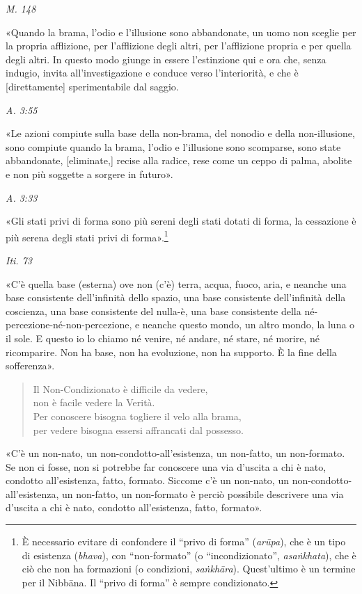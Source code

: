 \emph{M. 148}


«Quando la brama, l’odio e l’illusione sono abbandonate, un uomo non
sceglie per la propria afflizione, per l’afflizione degli altri, per
l’afflizione propria e per quella degli altri. In questo modo giunge in
essere l’estinzione qui e ora che, senza indugio, invita
all’investigazione e conduce verso l’interiorità, e che è [direttamente]
sperimentabile dal saggio.


\emph{A. 3:55}


«Le azioni compiute sulla base della non-brama, del nonodio e della
non-illusione, sono compiute quando la brama, l’odio e l’illusione sono
scomparse, sono state abbandonate, [eliminate,] recise alla radice, rese
come un ceppo di palma, abolite e non più soggette a sorgere in futuro».


\emph{A. 3:33}


«Gli stati privi di forma sono più sereni degli stati dotati di forma,
la cessazione è più serena degli stati privi di
forma».\footnote{È necessario evitare di confondere il “privo di forma” (\emph{arūpa}), che è un tipo di esistenza (\emph{bhava}), con “non-formato” (o “incondizionato”, \emph{asaṅkhata}), che è ciò che non ha formazioni (o condizioni, \emph{saṅkhāra}). Quest’ultimo è un termine per il Nibbāna. Il “privo di forma” è sempre condizionato.}


\emph{Iti. 73}


«C’è quella base (esterna) ove non (c’è) terra, acqua, fuoco, aria, e
neanche una base consistente dell’infinità dello spazio, una base
consistente dell’infinità della coscienza, una base consistente del
nulla-è, una base consistente della né-percezione-né-non-percezione, e
neanche questo mondo, un altro mondo, la luna o il sole. E questo io lo
chiamo né venire, né andare, né stare, né morire, né ricomparire. Non ha
base, non ha evoluzione, non ha supporto. È la fine della sofferenza».


\begin{quote}
Il Non-Condizionato è difficile da vedere, \\
non è facile vedere la Verità. \\
Per conoscere bisogna togliere il velo alla brama, \\
per vedere bisogna essersi affrancati dal possesso.
\end{quote}

«C’è un non-nato, un non-condotto-all’esistenza, un non-fatto, un
non-formato. Se non ci fosse, non si potrebbe far conoscere una via
d’uscita a chi è nato, condotto all’esistenza, fatto, formato. Siccome
c’è un non-nato, un non-condotto-all’esistenza, un non-fatto, un
non-formato è perciò possibile descrivere una via d’uscita a chi è nato,
condotto all’esistenza, fatto, formato».



